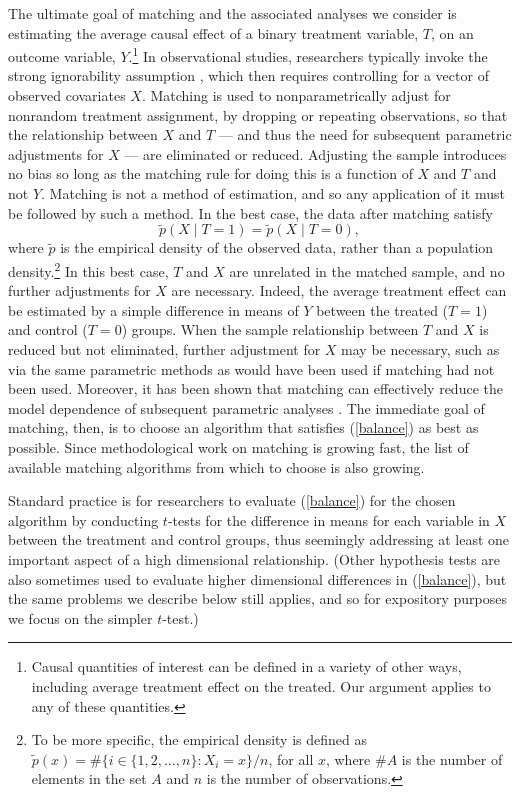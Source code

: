 \documentclass[11pt,titlepage]{article}
\begin{document}
The ultimate goal of matching and the associated analyses we consider
is estimating the average causal effect of a binary treatment
variable, $T$, on an outcome variable, $Y$.\footnote{Causal quantities
  of interest can be defined in a variety of other ways, including
  average treatment effect on the treated.  Our argument applies to
  any of these quantities.}  In observational studies, researchers
typically invoke the strong ignorability assumption \citep{RosRub83},
which then requires controlling for a vector of observed covariates
$X$.  Matching is used to nonparametrically adjust for nonrandom
treatment assignment, by dropping or repeating observations, so that
the relationship between $X$ and $T$ --- and thus the need for
subsequent parametric adjustments for $X$ --- are eliminated or
reduced.  Adjusting the sample introduces no bias so long as the
matching rule for doing this is a function of $X$ and $T$ and not $Y$.
Matching is not a method of estimation, and so any application of it
must be followed by such a method.  In the best case, the data after
matching satisfy
\begin{equation}
  \label{balance}
  \tilde p(X\mid T=1) = \tilde p(X\mid T=0),
\end{equation}
where $\tilde p$ is the empirical density of the observed data, rather
than a population density.\footnote{To be more specific, the empirical
  density is defined as $\tilde p(x) = \# \{ i\in \{1, 2, \dots, n \}:
  X_i = x \} / n$, for all $x$, where $\#A$ is the number of elements
  in the set $A$ and $n$ is the number of observations. } In this best
case, $T$ and $X$ are unrelated in the matched sample, and no further
adjustments for $X$ are necessary. Indeed, the average treatment
effect can be estimated by a simple difference in means of $Y$ between
the treated ($T=1$) and control ($T=0$) groups.  When the sample
relationship between $T$ and $X$ is reduced but not eliminated,
further adjustment for $X$ may be necessary, such as via the same
parametric methods as would have been used if matching had not been
used. Moreover, it has been shown that matching can effectively reduce
the model dependence of subsequent parametric analyses
\citep{HoImaKin06}.  The immediate goal of matching, then, is to
choose an algorithm that satisfies (\ref{balance}) as best as
possible.  Since methodological work on matching is growing fast, the
list of available matching algorithms from which to choose is also
growing.

Standard practice is for researchers to evaluate (\ref{balance}) for
the chosen algorithm by conducting $t$-tests for the difference in
means for each variable in $X$ between the treatment and control
groups, thus seemingly addressing at least one important aspect of a
high dimensional relationship.  (Other hypothesis tests are also
sometimes used to evaluate higher dimensional differences in
(\ref{balance}), but the same problems we describe below still
applies, and so for expository purposes we focus on the simpler
$t$-test.)
\end{document}

